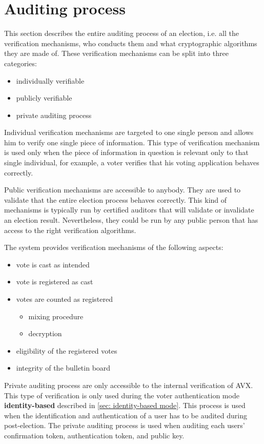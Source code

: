 \section{Auditing process} \label{sec: auditing process}
This section describes the entire auditing process of an election, i.e. all the verification mechanisms, who conducts them and what cryptographic algorithms they are made of. These verification mechanisms can be split into three categories:
\begin{itemize}
    \item individually verifiable
    \item publicly verifiable
    \item private auditing process
\end{itemize}

Individual verification mechanisms are targeted to one single person and allows him to verify one single piece of information. This type of verification mechanism is used only when the piece of information in question is relevant only to that single individual, for example, a voter verifies that his voting application behaves correctly. 

Public verification mechanisms are accessible to anybody. They are used to validate that the entire election process behaves correctly. This kind of mechanisms is typically run by certified auditors that will validate or invalidate an election result. Nevertheless, they could be run by any public person that has access to the right verification algorithms.

The system provides verification mechanisms of the following aspects:
\begin{itemize}
    \item vote is cast as intended
    \item vote is registered as cast
    \item votes are counted as registered
    \begin{itemize}
        \item mixing procedure
        \item decryption
    \end{itemize}
    \item eligibility of the registered votes
    \item integrity of the bulletin board
\end{itemize}

Private auditing process are only accessible to the internal verification of AVX. This type of verification is only used during the voter authentication mode \textbf{identity-based} described in \cref{sec: identity-based mode}. This process is used when the identification and authentication of a user has to be audited during post-election. The private auditing process is used when auditing each users' confirmation token, authentication token, and public key.
